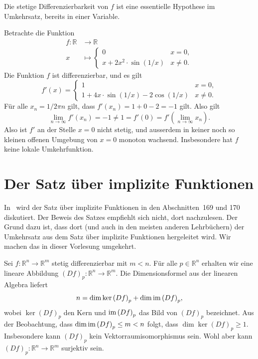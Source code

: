 \documentclass[../main.tex]{subfiles}
\begin{document}
\begin{remark}
  Die stetige Differenzierbarkeit von $f$ 
  ist eine essentielle Hypothese im Umkehrsatz,
  bereits in einer Variable.
\end{remark}

\begin{example}
  Betrachte die Funktion
  \begin{align*}
    f \colon \mathbb{R} & \to \mathbb{R} \\
    x & \mapsto 
    \begin{cases}
      0 & x = 0, \\
      x + 2x^2 \cdot \sin(1/x) & x \neq 0.
    \end{cases}
  \end{align*}
  Die Funktion $f$ ist differenzierbar, und es gilt
  \[
    f'(x) =
    \begin{cases}
      1 & x = 0, \\
      1 + 4x \cdot \sin(1/x) - 2 \cos(1/x) & x \neq 0.
    \end{cases}
  \]
  Für alle $x_n = 1/2\pi n$ gilt, dass $f'(x_n) = 1 + 0 - 2 = -1$ gilt.
  Also gilt
  \[
    \lim_{n \to \infty} f'(x_n) = -1 \neq 1 = f'(0)
    = f' \left( \lim_{n \to \infty} x_n \right).
  \]
  Also ist $f'$ an der Stelle $x = 0$ nicht stetig, und
  ausserdem in keiner noch so kleinen offenen Umgebung
  von $x = 0$ monoton wachsend.
  Insbesondere hat $f$ keine lokale Umkehrfunktion.
\end{example}

\section{Der Satz über implizite Funktionen}
In~\cite{heuser} wird der Satz über implizite Funktionen 
in den Abschnitten~169 und 170 diskutiert.
Der Beweis des Satzes empfiehlt sich nicht, dort nachzulesen.
Der Grund dazu ist, dass dort (und auch in den meisten
anderen Lehrbüchern) der 
Umkehrsatz aus dem Satz über implizite Funktionen
hergeleitet wird. Wir machen das in dieser Vorlesung umgekehrt. 

Sei $f \colon \mathbb{R}^n \to \mathbb{R}^m$ 
stetig differenzierbar mit $m < n$.
Für alle $p \in \mathbb{R}^n$ erhalten wir eine
lineare Abbildung ${(Df)}_p \colon \mathbb{R}^n \to \mathbb{R}^m$.
Die Dimensionsformel aus der linearen Algebra liefert
\[
  n = \dim \ker {(Df)}_p + \dim \operatorname{im} {(Df)}_p,
\]
wobei $\ker {(Df)}_p$ den Kern und
$\operatorname{im} {(Df)}_p$ das Bild von ${(Df)}_p$ bezeichnet.
Aus der Beobachtung, dass
$\dim \operatorname{im} {(Df)}_p \leq m < n$ folgt, dass
$\dim \ker {(Df)}_p \geq 1$.
Insbesondere kann ${(Df)}_p$ kein Vektorraumisomorphismus sein.
Wohl aber kann ${(Df)}_p \colon \mathbb{R}^n \to \mathbb{R}^m$ 
surjektiv sein.
\end{document}
